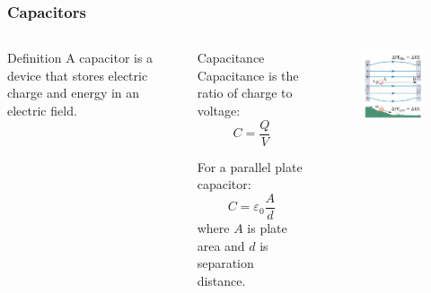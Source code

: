 \documentclass{beamer}
\begin{document}
\begin{frame}
    \frametitle{Capacitors}
    \begin{columns}
        \begin{block}{Definition}
            A capacitor is a device that stores electric charge and energy in an electric field.
        \end{block}
        
        \begin{block}{Capacitance}
            Capacitance is the ratio of charge to voltage:
            \begin{equation}
                C = \frac{Q}{V}
            \end{equation}
            
            For a parallel plate capacitor:
            \begin{equation}
                C = \varepsilon_0 \frac{A}{d}
            \end{equation}
            where $A$ is plate area and $d$ is separation distance.
        \end{block}
        
        \begin{alertblock}{ }
            \begin{figure}
                \centering
                \includegraphics[width=1\linewidth]{phys11-electrostatics-parallel-plate-capacitor.png}
            \end{figure}
        \end{alertblock}
    \end{columns}
\end{frame}
\end{document}
